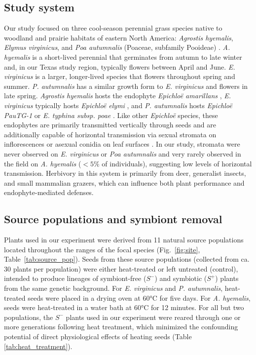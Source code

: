 \documentclass[12pt]{article}\usepackage[]{graphicx}\usepackage[dvipsnames]{xcolor}
\begin{document}
\subsection*{Study system}
Our study focused on three cool-season perennial grass species native to woodland and prairie habitats of eastern North America: \emph{Agrostis hyemalis}, \emph{Elymus virginicus}, and \emph{Poa autumnalis} (Poaceae, subfamily Pooideae) \citep{shaw2011guide}.
\emph{A. hyemalis} is a short-lived perennial that germinates from autumn to late winter and, in our Texas study region, typically flowers between April and June. 
\emph{E. virginicus} is a larger, longer-lived species that flowers throughout spring and summer. 
\emph{P. autumnalis} has a similar growth form to \emph{E. virginicus} and flowers in late spring. 
\emph{Agrostis hyemalis} hosts the endophyte \emph{Epichloë amarillans} \citep{white1994endophyte}, \emph{E. virginicus} typically hosts \emph{Epichloë elymi} \citep{liu2023fungi}, and \emph{P. autumnalis} hosts \emph{Epichloë PauTG-1} or \emph{E. typhina subsp. poae} \citep{gundel2020simulated}.
Like other \emph{Epichloë} species, these endophytes are primarily transmitted vertically through seeds and are additionally capable of horizontal transmission via sexual stromata on inflorescences or asexual conidia on leaf surfaces \citep{clay2002evolutionary, gundel2020simulated,leuchtmann2014nomenclatural}. 
In our study, stromata were never observed on \emph{E. virginicus} or \emph{Poa autumnalis} and very rarely observed in the field on \emph{A. hyemalis} ($<5\%$ of individuals), suggesting low levels of horizontal transmission.
Herbivory in this system is primarily from deer, generalist insects, and small mammalian grazers, which can influence both plant performance and endophyte-mediated defenses. 

\subsection*{Source populations and symbiont removal}
Plants used in our experiment were derived from 11 natural source populations located throughout the ranges of the focal species (Fig.~\ref{fig:site}, Table~\ref{tab:source_pop}). 
Seeds from these source populations (collected from ca. 30 plants per population) were either heat-treated or left untreated (control), intended to produce lineages of symbiont-free ($S^-$) and symbiotic ($S^+$) plants from the same genetic background. 
For \emph{E. virginicus} and \emph{P. autumnalis}, heat-treated seeds were placed in a drying oven at 60°C for five days. 
For \emph{A. hyemalis}, seeds were heat-treated in a water bath at 60°C for 12 minutes.
For all but two populations, the $S^-$ plants used in our experiment were reared through one or more generations following heat treatment, which minimized the confounding potential of direct physiological effects of heating seeds (Table \ref{tab:heat_treatment}). 
\end{document}
